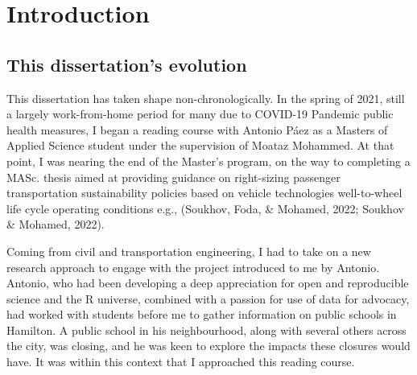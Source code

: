 \documentclass[
11pt, %
oneside, %
english, %
singlespacing, %
]{macthesis} %
\begin{document}
\label{lastoffront}
\clearpage


\mainmatter %
\pagestyle{thesis}
\chapter*{Introduction}\label{introduction}

\section{This dissertation's evolution}\label{this-dissertations-evolution}

This dissertation has taken shape non-chronologically. In the spring of 2021, still a largely work-from-home period for many due to COVID-19 Pandemic public health measures, I began a reading course with Antonio Páez as a Masters of Applied Science student under the supervision of Moataz Mohammed. At that point, I was nearing the end of the Master's program, on the way to completing a MASc. thesis aimed at providing guidance on right-sizing passenger transportation sustainability policies based on vehicle technologies well-to-wheel life cycle operating conditions e.g., (Soukhov, Foda, \& Mohamed, 2022; Soukhov \& Mohamed, 2022).

Coming from civil and transportation engineering, I had to take on a new research approach to engage with the project introduced to me by Antonio. Antonio, who had been developing a deep appreciation for open and reproducible science and the R universe, combined with a passion for use of data for advocacy, had worked with students before me to gather information on public schools in Hamilton. A public school in his neighbourhood, along with several others across the city, was closing, and he was keen to explore the impacts these closures would have. It was within this context that I approached this reading course.
\end{document}
